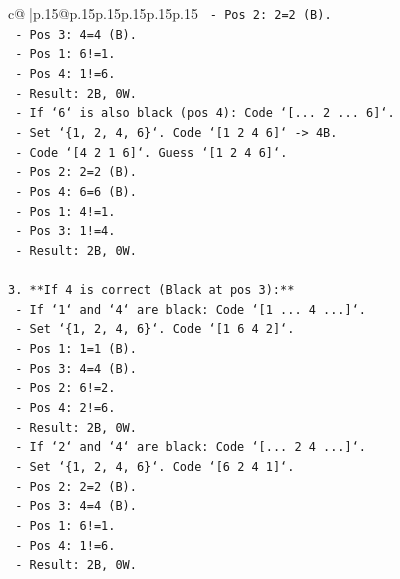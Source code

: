 \documentclass{article}
\begin{document}
{\begin{supertabular}{c@{$\;$}|p{.15\linewidth}@{}p{.15\linewidth}p{.15\linewidth}p{.15\linewidth}p{.15\linewidth}p{.15\linewidth}}
{{{\texttt{            {-}   Pos 2: 2=2 (B).} \\
\texttt{            {-}   Pos 3: 4=4 (B).} \\
\texttt{            {-}   Pos 1: 6!=1.} \\
\texttt{            {-}   Pos 4: 1!=6.} \\
\texttt{            {-}   Result: 2B, 0W.} \\
\texttt{    {-}   If `6` is also black (pos 4): Code `{[}... 2 ... 6{]}`.} \\
\texttt{        {-}   Set `\{1, 2, 4, 6\}`. Code `{[}1 2 4 6{]}` {-}> 4B.} \\
\texttt{        {-}   Code `{[}4 2 1 6{]}`. Guess `{[}1 2 4 6{]}`.} \\
\texttt{            {-}   Pos 2: 2=2 (B).} \\
\texttt{            {-}   Pos 4: 6=6 (B).} \\
\texttt{            {-}   Pos 1: 4!=1.} \\
\texttt{            {-}   Pos 3: 1!=4.} \\
\texttt{            {-}   Result: 2B, 0W.} \\
\\ 
\texttt{3.  **If 4 is correct (Black at pos 3):**} \\
\texttt{    {-}   If `1` and `4` are black: Code `{[}1 ... 4 ...{]}`.} \\
\texttt{        {-}   Set `\{1, 2, 4, 6\}`. Code `{[}1 6 4 2{]}`.} \\
\texttt{            {-}   Pos 1: 1=1 (B).} \\
\texttt{            {-}   Pos 3: 4=4 (B).} \\
\texttt{            {-}   Pos 2: 6!=2.} \\
\texttt{            {-}   Pos 4: 2!=6.} \\
\texttt{            {-}   Result: 2B, 0W.} \\
\texttt{    {-}   If `2` and `4` are black: Code `{[}... 2 4 ...{]}`.} \\
\texttt{        {-}   Set `\{1, 2, 4, 6\}`. Code `{[}6 2 4 1{]}`.} \\
\texttt{            {-}   Pos 2: 2=2 (B).} \\
\texttt{            {-}   Pos 3: 4=4 (B).} \\
\texttt{            {-}   Pos 1: 6!=1.} \\
\texttt{            {-}   Pos 4: 1!=6.} \\
\texttt{            {-}   Result: 2B, 0W.} \\
}}}
\end{supertabular}}
\end{document}

